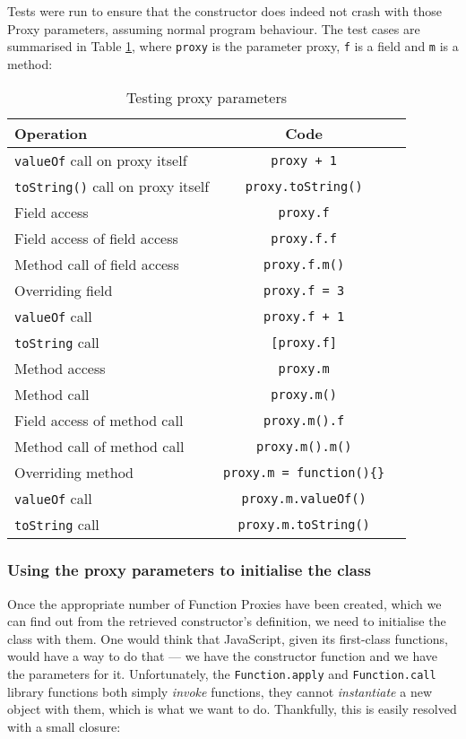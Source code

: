Tests were run to ensure that the constructor does indeed not crash with those Proxy parameters, assuming normal program behaviour. The test cases are summarised in Table \ref{nocrash}, where \texttt{proxy} is the parameter proxy, \texttt{f} is a field and \texttt{m} is a method:

\begin{table}[h]
\centering
\begin{tabular}{|l|c|c|}
\hline
\textbf{Operation} & \textbf{Code} \\
\hline
\texttt{valueOf} call on proxy itself & \texttt{proxy + 1}\\
\texttt{toString()} call on proxy itself & \texttt{proxy.toString()}\\
Field access & \texttt{proxy.f} \\
Field access of field access & \texttt{proxy.f.f} \\
Method call of field access & \texttt{proxy.f.m()} \\
Overriding field & \texttt{proxy.f = 3} \\
\texttt{valueOf} call & \texttt{proxy.f + 1} \\
\texttt{toString} call & \texttt{[proxy.f]} \\
Method access & \texttt{proxy.m} \\
Method call & \texttt{proxy.m()} \\
Field access of method call & \texttt{proxy.m().f} \\
Method call of method call & \texttt{proxy.m().m()} \\
Overriding method & \texttt{proxy.m = function()\{\}} \\
\texttt{valueOf} call & \texttt{proxy.m.valueOf()} \\
\texttt{toString} call & \texttt{proxy.m.toString()} \\
\hline
\end{tabular}
\caption{Testing proxy parameters}
\label{nocrash}
\end{table}

\subsubsection{Using the proxy parameters to initialise the class}
Once the appropriate number of Function Proxies have been created, which we can find out from the retrieved constructor's definition, we need to initialise the class with them. One would think that JavaScript, given its first-class functions, would have a way to do that --- we have the constructor function and we have the parameters for it. Unfortunately, the \texttt{Function.apply} and \texttt{Function.call} library functions both simply \emph{invoke} functions, they cannot \emph{instantiate} a new object with them, which is what we want to do. Thankfully, this is easily resolved with a small closure:

